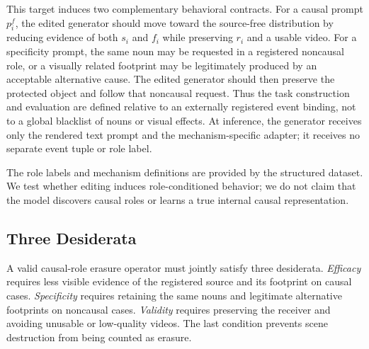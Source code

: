 This target induces two complementary behavioral contracts. For a causal
prompt $p_i^{f}$, the edited generator should move toward the source-free
distribution by reducing evidence of both $s_i$ and $f_i$ while preserving
$r_i$ and a usable video. For a specificity prompt, the same noun may be
requested in a registered noncausal role, or a visually related footprint may
be legitimately produced by an acceptable alternative cause. The edited
generator should then preserve the protected object and follow that noncausal
request. Thus the task construction and evaluation are defined relative to an
externally registered event binding, not to a global blacklist of nouns or
visual effects. At inference, the generator receives only the rendered text
prompt and the mechanism-specific adapter; it receives no separate event
tuple or role label.

The role labels and mechanism definitions are provided by the structured
dataset. We test whether editing induces role-conditioned behavior; we do not
claim that the model discovers causal roles or learns a true internal causal
representation.

\subsection{Three Desiderata}
\label{subsec:desiderata}

A valid causal-role erasure operator must jointly satisfy three desiderata.
\emph{Efficacy} requires less visible evidence of the registered source and
its footprint on causal cases. \emph{Specificity} requires retaining the same
nouns and legitimate alternative footprints on noncausal cases.
\emph{Validity} requires preserving the receiver and avoiding unusable or
low-quality videos. The last condition prevents scene destruction from being
counted as erasure.

